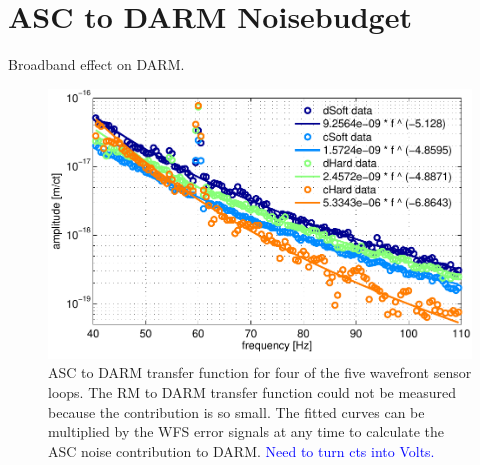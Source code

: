 \section{ASC to DARM Noisebudget}
Broadband effect on DARM.



\begin{figure}
\begin{centering}
\includegraphics[width=1.0\columnwidth]{figures/ASC2DARM_TFs.pdf}
\caption[Measured ASC to DARM transfer functions]{ASC to DARM transfer
  function for four of the five wavefront sensor loops. The RM to DARM
  transfer function could not be measured because the contribution is
  so small. The fitted curves can be multiplied by the WFS error
  signals at any time to calculate the ASC noise contribution to
  DARM. \textcolor{blue}{Need to turn cts into Volts.}}
\end{centering}
\end{figure}



